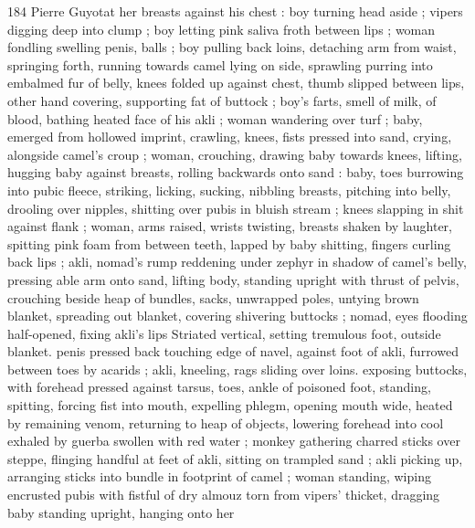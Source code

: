 184 Pierre Guyotat
her breasts against his chest : boy turning head aside ; vipers
digging deep into clump ; boy letting pink saliva froth between lips ;
woman fondling swelling penis, balls ; boy pulling back loins,
detaching arm from waist, springing forth, running towards camel
lying on side, sprawling purring into embalmed fur of belly, knees
folded up against chest, thumb slipped between lips, other hand
covering, supporting fat of buttock ; boy's farts, smell of milk, of
blood, bathing heated face of his akli ; woman wandering over turf ;
baby, emerged from hollowed imprint, crawling, knees, fists pressed
into sand, crying, alongside camel's croup ; woman, crouching,
drawing baby towards knees, lifting, hugging baby against breasts,
rolling backwards onto sand : baby, toes burrowing into pubic fleece,
striking, licking, sucking, nibbling breasts, pitching into belly,
drooling over nipples, shitting over pubis in bluish stream ; knees
slapping in shit against flank ; woman, arms raised, wrists twisting,
breasts shaken by laughter, spitting pink foam from between teeth,
lapped by baby shitting, fingers curling back lips ; akli, nomad's
rump reddening under zephyr in shadow of camel's belly, pressing
able arm onto sand, lifting body, standing upright with thrust of
pelvis, crouching beside heap of bundles, sacks, unwrapped poles,
untying brown blanket, spreading out blanket, covering shivering
buttocks ; nomad, eyes flooding half-opened, fixing akli’s lips
Striated vertical, setting tremulous foot, outside blanket. penis
pressed back touching edge of navel, against foot of akli, furrowed
between toes by acarids ; akli, kneeling, rags sliding over loins.
exposing buttocks, with forehead pressed against tarsus, toes, ankle
of poisoned foot, standing, spitting, forcing fist into mouth, expelling
phlegm, opening mouth wide, heated by remaining venom, returning
to heap of objects, lowering forehead into cool exhaled by guerba
swollen with red water ; monkey gathering charred sticks over
steppe, flinging handful at feet of akli, sitting on trampled sand ; akli
picking up, arranging sticks into bundle in footprint of camel ; woman
standing, wiping encrusted pubis with fistful of dry almouz torn from
vipers’ thicket, dragging baby standing upright, hanging onto her

